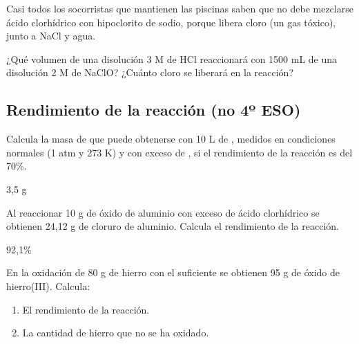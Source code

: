 \documentclass[
]{article}
\providecommand{\tightlist}{%
  \setlength{\itemsep}{0pt}\setlength{\parskip}{0pt}}
\begin{document}
\begin{exercise}[tags=SM16] Casi todos los socorristas que mantienen las
piscinas saben que no debe mezclarse ácido clorhídrico con hipoclorito
de sodio, porque libera cloro (un gas tóxico), junto a NaCl y agua.

¿Qué volumen de una disolución 3 M de HCl reaccionará con 1500 mL de una
disolución 2 M de NaClO? ¿Cuánto cloro se liberará en la
reacción?\end{exercise}

\begin{solution}\end{solution}

\hypertarget{rendimiento-de-la-reacciuxf3n-no-4uxba-eso}{%
\subsection{Rendimiento de la reacción (no 4º
ESO)}\label{rendimiento-de-la-reacciuxf3n-no-4uxba-eso}}

\begin{exercise}[tags=OXF15] Calcula la masa de  que puede
obtenerse con 10 L de , medidos en condiciones normales (1 atm y
273 K) y con exceso de , si el rendimiento de la reacción es del
70\%.\end{exercise}

\begin{solution}3,5 g\end{solution}

\begin{exercise}[tags=OXF15] Al reaccionar 10 g de óxido de aluminio con
exceso de ácido clorhídrico se obtienen 24,12 g de cloruro de aluminio.
Calcula el rendimiento de la reacción.\end{exercise}

\begin{solution}92,1\%\end{solution}

\begin{exercise}[tags=OXF15] En la oxidación de 80 g de hierro con el
suficiente  se obtienen 95 g de óxido de hierro(III). Calcula:

\begin{enumerate}
\def\labelenumi{\alph{enumi})}
\tightlist
\item
  El rendimiento de la reacción.
\item
  La cantidad de hierro que no se ha oxidado.
\end{enumerate}

\end{exercise}
\end{document}
